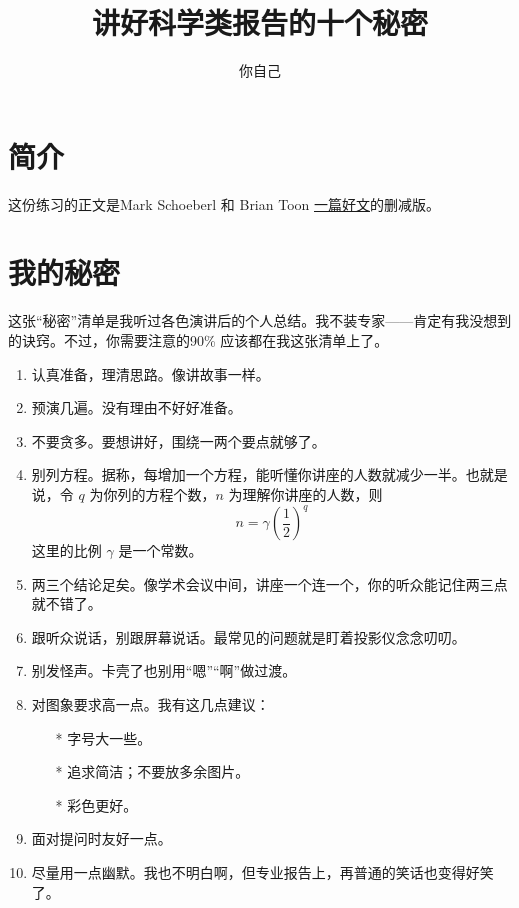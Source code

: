 \documentclass[12pt]{article}
\title{讲好科学类报告的十个秘密}
\author{你自己}
\begin{document}
\maketitle

\section{简介}

这份练习的正文是Mark Schoeberl 和 Brian Toon \href{http://www.cgd.ucar.edu/cms/agu/scientific_talk.html}{一篇好文}的删减版。

\section{我的秘密}

这张“秘密”清单是我听过各色演讲后的个人总结。我不装专家——肯定有我没想到的诀窍。不过，你需要注意的90\% 应该都在我这张清单上了。

\begin{enumerate}

\item 认真准备，理清思路。像讲故事一样。

\item 预演几遍。没有理由不好好准备。

\item 不要贪多。要想讲好，围绕一两个要点就够了。

\item 别列方程。据称，每增加一个方程，能听懂你讲座的人数就减少一半。也就是说，令 $q$ 为你列的方程个数，$n$ 为理解你讲座的人数，则
\begin{equation}
n = \gamma \left( \frac{1}{2} \right)^q
\end{equation}
这里的比例 $\gamma$ 是一个常数。

\item 两三个结论足矣。像学术会议中间，讲座一个连一个，你的听众能记住两三点就不错了。

\item 跟听众说话，别跟屏幕说话。最常见的问题就是盯着投影仪念念叨叨。

\item 别发怪声。卡壳了也别用“嗯”“啊”做过渡。

\item 对图象要求高一点。我有这几点建议：

\begin{itemize}
\item[*] 字号大一些。

\item[*] 追求简洁；不要放多余图片。

\item[*] 彩色更好。

\end{itemize}

\item 面对提问时友好一点。

\item 尽量用一点幽默。我也不明白啊，但专业报告上，再普通的笑话也变得好笑了。

\end{enumerate}
\end{document}
